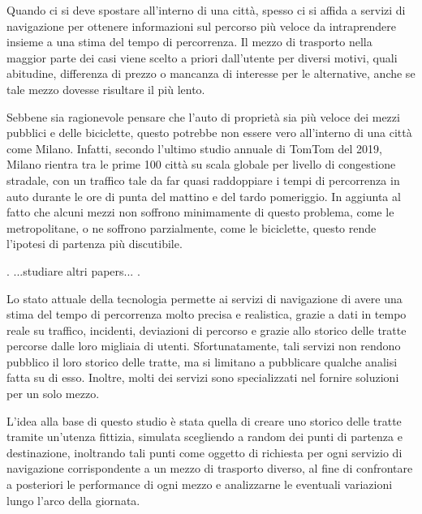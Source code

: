 Quando ci si deve spostare all'interno di una città, spesso ci si affida a servizi di navigazione per ottenere informazioni sul percorso più veloce da intraprendere insieme a una stima del tempo di percorrenza.
Il mezzo di trasporto nella maggior parte dei casi viene scelto a priori dall'utente per diversi motivi, quali abitudine, differenza di prezzo o mancanza di interesse per le alternative, anche se tale mezzo dovesse risultare il più lento.

Sebbene sia ragionevole pensare che l'auto di proprietà sia più veloce dei mezzi pubblici e delle biciclette, questo potrebbe non essere vero all'interno di una città come Milano. Infatti, secondo l'ultimo studio annuale di TomTom del 2019\cite{tomtomindexmilan}, Milano rientra tra le prime 100 città su scala globale per livello di congestione stradale, con un traffico tale da far quasi raddoppiare i tempi di percorrenza in auto durante le ore di punta del mattino e del tardo pomeriggio. In aggiunta al fatto che alcuni mezzi non soffrono minimamente di questo problema, come le metropolitane, o ne soffrono parzialmente, come le biciclette, questo rende l'ipotesi di partenza più discutibile.

.\newline
...studiare altri papers... \newline
.

Lo stato attuale della tecnologia permette ai servizi di navigazione di avere una stima del tempo di percorrenza molto precisa e realistica, grazie a dati in tempo reale su traffico, incidenti, deviazioni di percorso e grazie allo storico delle tratte percorse dalle loro migliaia di utenti. Sfortunatamente, tali servizi non rendono pubblico il loro storico delle tratte, ma si limitano a pubblicare qualche analisi fatta su di esso. Inoltre, molti dei servizi sono specializzati nel fornire soluzioni per un solo mezzo.

L'idea alla base di questo studio è stata quella di creare uno storico delle tratte tramite un'utenza fittizia, simulata scegliendo a random dei punti di partenza e destinazione, inoltrando tali punti come oggetto di richiesta per ogni servizio di navigazione corrispondente a un mezzo di trasporto diverso, al fine di confrontare a posteriori le performance di ogni mezzo e analizzarne le eventuali variazioni lungo l'arco della giornata.